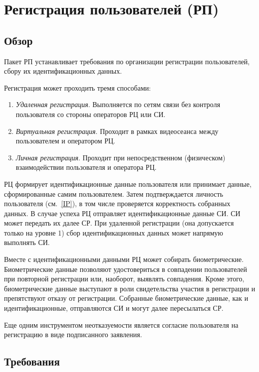 \section{Регистрация пользователей (РП)}\label{UR}

\subsection{Обзор}\label{UR.Intro}

Пакет РП устанавливает требования по организации регистрации пользователей,
сбору их идентификационных данных.

Регистрация может проходить тремя способами:
\begin{enumerate}
\item
{\it Удаленная регистрация}. 
Выполняется по сетям связи без контроля пользователя со стороны операторов РЦ 
или СИ.
\item
{\it Виртуальная регистрация}. 
Проходит в рамках видеосеанса между пользователем и оператором РЦ. 
\item
{\it Личная регистрация}. 
Проходит при непосредственном (физическом) взаимодействии пользователя и 
оператора РЦ.
\end{enumerate}

РЦ формирует идентификационные данные пользователя или принимает данные, 
сформированные самим пользователем. Затем подтверждается личность пользователя
(см.~\ref{IP}), в том числе проверяется корректность собранных данных. В случае 
успеха РЦ отправляет идентификационные данные СИ. СИ может передать их далее СР.
%
При удаленной регистрации (она допускается только на уровне 1) сбор 
идентификационных данных может напрямую выполнять СИ.

Вместе с идентификационными данными РЦ может собирать биометрические.
Биометрические данные позволяют удостовериться в совпадении пользователей при 
повторной регистрации или, наоборот, выявлять совпадения. 
%
Кроме этого, биометрические данные выступают в роли свидетельства участия в 
регистрации и препятствуют отказу от регистрации. 
%
Собранные биометрические данные, как и идентификационные, отправляются СИ и 
могут далее пересылаться СР.

Еще одним инструментом неотказуемости является согласие пользователя на 
регистрацию в виде подписанного заявления.

\subsection{Требования}\label{UR.Reqs}

